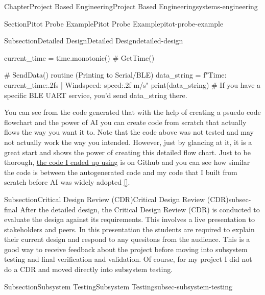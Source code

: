 \documentclass[oneside,10pt,]{book}
\newcommand{\xreffont}{\relax}
\newcommand{\linkhilite}[1]{\underline{#1}}
\numberwithin{equation}{section}
\begin{document}
\begin{chapterptx}{Chapter}{Project Based Engineering}{}{Project Based Engineering}{}{}{systems-engineering}
\begin{sectionptx}{Section}{Pitot Probe Example}{}{Pitot Probe Example}{}{}{pitot-probe-example}
\begin{subsectionptx}{Subsection}{Detailed Design}{}{Detailed Design}{}{}{detailed-design}
\begin{preformatted}
        current_time = time.monotonic() # GetTime()
        
        # SendData() routine (Printing to Serial/BLE)
        data_string = f"Time: {current_time:.2f}s | Windspeed: {speed:.2f} m/s"
        print(data_string)
        # If you have a specific BLE UART service, you'd send data_string there.
\end{preformatted}
You can see from the code generated that with the help of creating a psuedo code flowchart and the power of AI you can create code from scratch that actually flows the way you want it to. Note that the code above was not tested and may not actually work the way you intended. However, just by glancing at it, it is a great start and shows the power of creating this detailed flow chart. Just to be thorough, \href{https://github.com/cmontalvo251/Microcontrollers/blob/master/Circuit_Playground/CircuitPython/CPB_DataLogger/pitot_datalogger_bluetooth.py}{\linkhilite{the code I ended up using}} is on Github and you can see how similar the code is between the autogenerated code and my code that I built from scratch before AI was widely adopted \hyperlink{Github}{\linkhilite{[{\xreffont 33}]}}.%
\end{subsectionptx}
%
%
\typeout{************************************************}
\typeout{************************************************}
%
\begin{subsectionptx}{Subsection}{Critical Design Review (CDR)}{}{Critical Design Review (CDR)}{}{}{subsec-final}
After the detailed design, the Critical Design Review (CDR) is conducted to evaluate the design against its requirements. This involves a live presentation to stakeholders and peers. In this presentation the students are required to explain their current design and respond to any quesitons from the audience. This is a good way to receive feedback about the project before moving into subsystem testing and final verification and validation. Of course, for my project I did not do a CDR and moved directly into subsystem testing.%
\end{subsectionptx}
%
%
\typeout{************************************************}
\typeout{************************************************}
%
\begin{subsectionptx}{Subsection}{Subsystem Testing}{}{Subsystem Testing}{}{}{subsec-subsystem-testing}

\end{subsectionptx}
\end{sectionptx}
\end{chapterptx}
\end{document}
